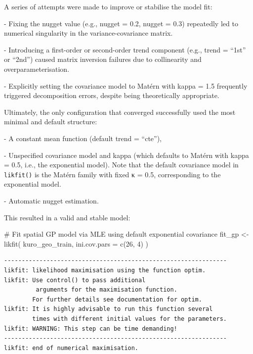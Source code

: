 \documentclass[
  11pt,
]{article}
\newenvironment{Shaded}{\begin{snugshade}}{\end{snugshade}}
\newcommand{\AttributeTok}[1]{\textcolor[rgb]{0.40,0.45,0.13}{#1}}
\newcommand{\CommentTok}[1]{\textcolor[rgb]{0.37,0.37,0.37}{#1}}
\newcommand{\DecValTok}[1]{\textcolor[rgb]{0.68,0.00,0.00}{#1}}
\newcommand{\FunctionTok}[1]{\textcolor[rgb]{0.28,0.35,0.67}{#1}}
\newcommand{\NormalTok}[1]{\textcolor[rgb]{0.00,0.23,0.31}{#1}}
\newcommand{\OtherTok}[1]{\textcolor[rgb]{0.00,0.23,0.31}{#1}}
\begin{document}
A series of attempts were made to improve or stabilise the model fit:

- Fixing the nugget value (e.g., nugget = 0.2, nugget = 0.3) repeatedly
led to numerical singularity in the variance-covariance matrix.

- Introducing a first-order or second-order trend component (e.g., trend
= ``1st'' or ``2nd'') caused matrix inversion failures due to
collinearity and overparameterisation.

- Explicitly setting the covariance model to Matérn with kappa = 1.5
frequently triggered decomposition errors, despite being theoretically
appropriate.

Ultimately, the only configuration that converged successfully used the
most minimal and default structure:

- A constant mean function (default trend = ``cte''),

- Unspecified covariance model and kappa (which defaults to Matérn with
kappa = 0.5, i.e., the exponential model). Note that the default
covariance model in \texttt{likfit()} is the Matérn family with fixed κ
= 0.5, corresponding to the exponential model.

- Automatic nugget estimation.

This resulted in a valid and stable model:

\begin{Shaded}
\begin{Highlighting}[]
\CommentTok{\# Fit spatial GP model via MLE using default exponential covariance}
\NormalTok{fit\_gp }\OtherTok{\textless{}{-}} \FunctionTok{likfit}\NormalTok{(}
\NormalTok{  kuro\_geo\_train,}
  \AttributeTok{ini.cov.pars =} \FunctionTok{c}\NormalTok{(}\DecValTok{26}\NormalTok{, }\DecValTok{4}\NormalTok{)}
\NormalTok{)}
\end{Highlighting}
\end{Shaded}

\begin{verbatim}
---------------------------------------------------------------
likfit: likelihood maximisation using the function optim.
likfit: Use control() to pass additional
         arguments for the maximisation function.
        For further details see documentation for optim.
likfit: It is highly advisable to run this function several
        times with different initial values for the parameters.
likfit: WARNING: This step can be time demanding!
---------------------------------------------------------------
likfit: end of numerical maximisation.
\end{verbatim}
\end{document}
